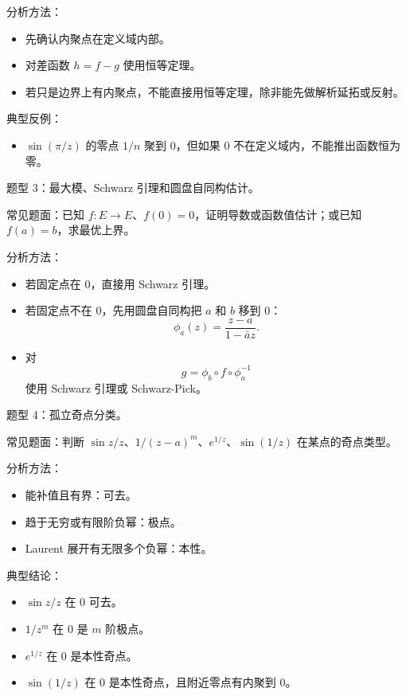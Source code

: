 \documentclass{article}
\begin{document}
分析方法：

\begin{itemize}
\item
  先确认内聚点在定义域内部。
\item
  对差函数 $h=f-g$ 使用恒等定理。
\item
  若只是边界上有内聚点，不能直接用恒等定理，除非能先做解析延拓或反射。
\end{itemize}

典型反例：

\begin{itemize}
\item
  $\sin(\pi/z)$ 的零点 $1/n$ 聚到 $0$，但如果
  $0$ 不在定义域内，不能推出函数恒为零。
\end{itemize}

题型 3：最大模、Schwarz 引理和圆盘自同构估计。

常见题面：已知
$f:E\to E$、$f(0)=0$，证明导数或函数值估计；或已知
$f(a)=b$，求最优上界。

分析方法：

\begin{itemize}
\item
  若固定点在 $0$，直接用 Schwarz 引理。
\item
  若固定点不在 $0$，先用圆盘自同构把 $a$ 和 $b$
  移到 $0$： \[
  \phi_a(z)=\frac{z-a}{1-\bar a z}.
  \]
\item
  对 \[
  g=\phi_b\circ f\circ \phi_a^{-1}
  \] 使用 Schwarz 引理或 Schwarz-Pick。
\end{itemize}

题型 4：孤立奇点分类。

常见题面：判断
\(\sin z/z\)、\(1/(z-a)^m\)、\(e^{1/z}\)、\(\sin(1/z)\)
在某点的奇点类型。

分析方法：

\begin{itemize}
\item
  能补值且有界：可去。
\item
  趋于无穷或有限阶负幂：极点。
\item
  Laurent 展开有无限多个负幂：本性。
\end{itemize}

典型结论：

\begin{itemize}
\item
  \(\sin z/z\) 在 \(0\) 可去。
\item
  \(1/z^m\) 在 \(0\) 是 \(m\) 阶极点。
\item
  \(e^{1/z}\) 在 \(0\) 是本性奇点。
\item
  \(\sin(1/z)\) 在 \(0\) 是本性奇点，且附近零点有内聚到
  \(0\)。
\end{itemize}
\end{document}
